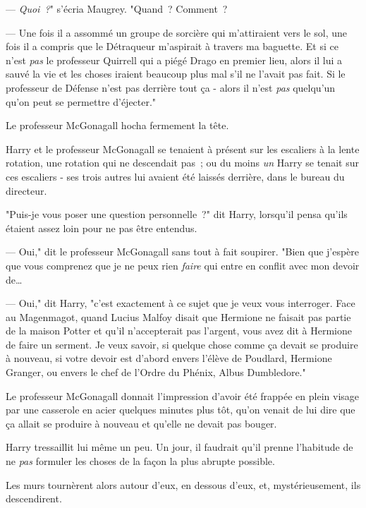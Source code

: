 --- \emph{Quoi~?}" s'écria Maugrey. "Quand~? Comment~?

--- Une fois il a assommé un groupe de sorcière qui m'attiraient vers le sol, une fois il a compris que le Détraqueur m'aspirait à travers ma baguette. Et si ce n'est \emph{pas} le professeur Quirrell qui a piégé Drago en premier lieu, alors il lui a sauvé la vie et les choses iraient beaucoup plus mal s'il ne l'avait pas fait. Si le professeur de Défense n'est pas derrière tout ça - alors il n'est \emph{pas} quelqu'un qu'on peut se permettre d'éjecter."

Le professeur McGonagall hocha fermement la tête.


Harry et le professeur McGonagall se tenaient à présent sur les escaliers à la lente rotation, une rotation qui ne descendait pas~; ou du moins \emph{un} Harry se tenait sur ces escaliers - ses trois autres lui avaient été laissés derrière, dans le bureau du directeur.

"Puis-je vous poser une question personnelle~?" dit Harry, lorsqu'il pensa qu'ils étaient assez loin pour ne pas être entendus.

--- Oui," dit le professeur McGonagall sans tout à fait soupirer. "Bien que j'espère que vous comprenez que je ne peux rien \emph{faire} qui entre en conflit avec mon devoir de…

--- Oui," dit Harry, "c'est exactement à ce sujet que je veux vous interroger. Face au Magenmagot, quand Lucius Malfoy disait que Hermione ne faisait pas partie de la maison Potter et qu'il n'accepterait pas l'argent, vous avez dit à Hermione de faire un serment. Je veux savoir, si quelque chose comme ça devait se produire à nouveau, si votre devoir est d'abord envers l'élève de Poudlard, Hermione Granger, ou envers le chef de l'Ordre du Phénix, Albus Dumbledore."

Le professeur McGonagall donnait l'impression d'avoir été frappée en plein visage par une casserole en acier quelques minutes plus tôt, qu'on venait de lui dire que ça allait se produire à nouveau et qu'elle ne devait pas bouger.

Harry tressaillit lui même un peu. Un jour, il faudrait qu'il prenne l'habitude de ne \emph{pas} formuler les choses de la façon la plus abrupte possible.

Les murs tournèrent alors autour d'eux, en dessous d'eux, et, mystérieusement, ils descendirent.

